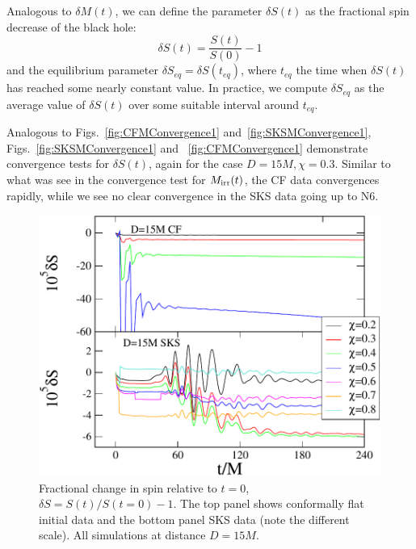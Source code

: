 Analogous to $\delta M(t)$, we can define the parameter $\delta S(t)$ as the
fractional spin decrease of the black hole:
\begin{equation}
\delta S(t)=\frac{S(t)}{S(0)} - 1
\end{equation}
and the equilibrium parameter $\delta S_{eq}=\delta S(t_{eq})$, where $t_{eq}$ the
time when $\delta S(t)$ has reached some nearly constant value.
In practice, we compute $\delta S_{eq}$ as the average value of
$\delta S(t)$
over some suitable interval around $t_{eq}$.

Analogous to Figs.~\ref{fig:CFMConvergence1}
and~\ref{fig:SKSMConvergence1}, Figs.~\ref{fig:SKSMConvergence1} and
~\ref{fig:CFMConvergence1}  demonstrate convergence tests for $\delta
S(t)$, again for the case $D=15M, \chi=0.3$. Similar to what was see
in the convergence test for $M_{\rm irr}(t)$, the CF data convergences
rapidly, while we see no clear convergence in the SKS data going up to N6.

\begin{figure}
\includegraphics[width=0.95\columnwidth]{chap5/SvsT2}
\caption{Fractional change in spin relative to $t=0$, $\delta S = S(t)/S(t=0)-1$.  The top panel shows conformally flat initial data and the bottom panel SKS data (note the different scale).  All simulations at distance $D=15M$.}
\label{fig:SvsT2}
\end{figure}


